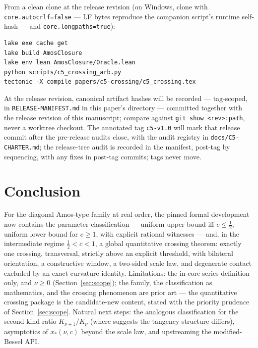 \documentclass[11pt]{article}
\newcommand{\lean}[1]{\texttt{#1}}
\begin{document}
\medskip
\noindent From a clean clone at the release revision (on Windows,
clone with \lean{core.autocrlf=false} --- LF bytes reproduce the
companion script's runtime self-hash --- and
\lean{core.longpaths=true}):
\begin{verbatim}
lake exe cache get
lake build AmosClosure
lake env lean AmosClosure/Oracle.lean
python scripts/c5_crossing_arb.py
tectonic -X compile papers/c5-crossing/c5_crossing.tex
\end{verbatim}
{\sloppy
At the release revision, canonical artifact hashes will be
recorded --- tag-scoped, in \lean{RELEASE-MANIFEST.md} in this
paper's directory --- committed together with the release revision
of this manuscript; compare against
\lean{git show <rev>:path}, never a worktree checkout.  The
annotated tag \lean{c5-v1.0} will mark that release commit after
the pre-release audits close, with the audit registry in
\lean{docs/C5-CHARTER.md}; the release-tree audit is recorded in
the manifest, post-tag by sequencing, with any fixes in post-tag
commits; tags never move.\par}

\section{Conclusion}

For the diagonal Amos-type family at real order, the pinned formal
development now contains the parameter classification ---
uniform upper bound iff $c \le \tfrac12$, uniform lower bound for
$c \ge 1$, with explicit rational witnesses --- and, in the
intermediate regime $\tfrac12 < c < 1$, a global quantitative
crossing theorem: exactly one crossing, transversal, strictly above
an explicit threshold, with bilateral orientation, a constructive
window, a two-sided scale law, and degenerate contact excluded by
an exact curvature identity.  Limitations: the in-core series
definition only, and $\nu \ge 0$ (Section~\ref{sec:scope}); the
family, the classification as mathematics, and the crossing
phenomenon are prior art \cite{RS16} --- the quantitative crossing
package is the candidate-new content, stated with the priority
prudence of Section~\ref{sec:scope}.  Natural next steps: the
analogous classification for the second-kind ratio
$K_{\nu+1}/K_\nu$ (where \cite{Segura23} suggests the tangency
structure differs), asymptotics of $x_*(\nu,c)$ beyond the scale
law, and upstreaming the modified-Bessel API.
\end{document}
